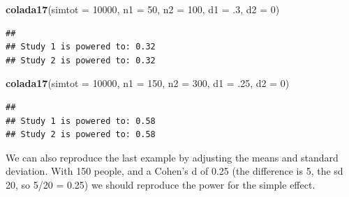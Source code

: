 \documentclass[]{book}
\newenvironment{Shaded}{\begin{snugshade}}{\end{snugshade}}
\newcommand{\DataTypeTok}[1]{\textcolor[rgb]{0.13,0.29,0.53}{#1}}
\newcommand{\DecValTok}[1]{\textcolor[rgb]{0.00,0.00,0.81}{#1}}
\newcommand{\FloatTok}[1]{\textcolor[rgb]{0.00,0.00,0.81}{#1}}
\newcommand{\KeywordTok}[1]{\textcolor[rgb]{0.13,0.29,0.53}{\textbf{#1}}}
\newcommand{\NormalTok}[1]{#1}
\begin{document}
\begin{Shaded}
\begin{Highlighting}[]
\KeywordTok{colada17}\NormalTok{(}\DataTypeTok{simtot =} \DecValTok{10000}\NormalTok{, }\DataTypeTok{n1 =} \DecValTok{50}\NormalTok{, }\DataTypeTok{n2 =} \DecValTok{100}\NormalTok{, }\DataTypeTok{d1 =} \FloatTok{.3}\NormalTok{, }\DataTypeTok{d2 =} \DecValTok{0}\NormalTok{)}
\end{Highlighting}
\end{Shaded}

\begin{verbatim}
## 
## Study 1 is powered to: 0.32
## Study 2 is powered to: 0.32
\end{verbatim}

\begin{Shaded}
\begin{Highlighting}[]
\KeywordTok{colada17}\NormalTok{(}\DataTypeTok{simtot =} \DecValTok{10000}\NormalTok{, }\DataTypeTok{n1 =} \DecValTok{150}\NormalTok{, }\DataTypeTok{n2 =} \DecValTok{300}\NormalTok{, }\DataTypeTok{d1 =} \FloatTok{.25}\NormalTok{, }\DataTypeTok{d2 =} \DecValTok{0}\NormalTok{)}
\end{Highlighting}
\end{Shaded}

\begin{verbatim}
## 
## Study 1 is powered to: 0.58
## Study 2 is powered to: 0.58
\end{verbatim}

We can also reproduce the last example by adjusting the means and standard deviation. With 150 people, and a Cohen's d of 0.25 (the difference is 5, the sd 20, so 5/20 = 0.25) we should reproduce the power for the simple effect.
\end{document}
